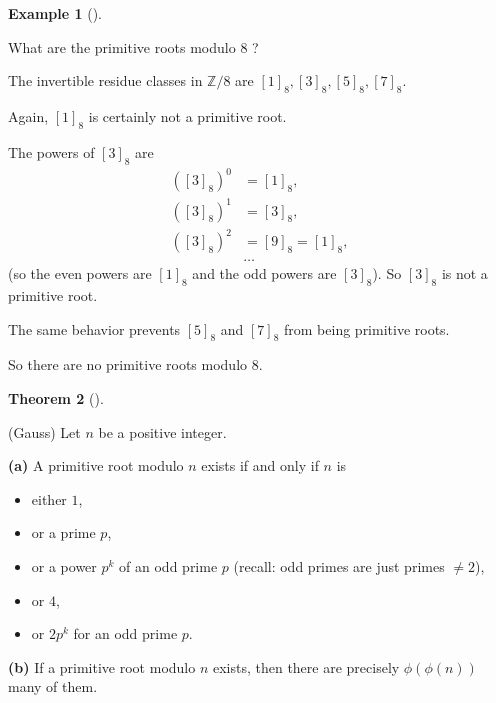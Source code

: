 \documentclass[numbers=enddot,12pt,final,onecolumn,notitlepage]{scrartcl}%
\numberwithin{exer}{subsection}
\theoremstyle{definition}
\newtheorem{theo}{Theorem}[subsection]
\newenvironment{theorem}[1][]
{\begin{theo}[#1]\begin{leftbar}}
{\end{leftbar}\end{theo}}
\newtheorem{exam}[theo]{Example}
\newenvironment{example}[1][]
{\begin{exam}[#1]\begin{leftbar}}
{\end{leftbar}\end{exam}}
\begin{document}
\begin{example}
What are the primitive roots modulo $8$ ?

The invertible residue classes in $\mathbb{Z}/8$ are $\left[  1\right]
_{8},\left[  3\right]  _{8},\left[  5\right]  _{8},\left[  7\right]  _{8}$.

Again, $\left[  1\right]  _{8}$ is certainly not a primitive root.

The powers of $\left[  3\right]  _{8}$ are
\begin{align*}
\left(  \left[  3\right]  _{8}\right)  ^{0}  &  =\left[  1\right]  _{8},\\
\left(  \left[  3\right]  _{8}\right)  ^{1}  &  =\left[  3\right]  _{8},\\
\left(  \left[  3\right]  _{8}\right)  ^{2}  &  =\left[  9\right]
_{8}=\left[  1\right]  _{8},\\
&  \ldots
\end{align*}
(so the even powers are $\left[  1\right]  _{8}$ and the odd powers are
$\left[  3\right]  _{8}$). So $\left[  3\right]  _{8}$ is not a primitive root.

The same behavior prevents $\left[  5\right]  _{8}$ and $\left[  7\right]
_{8}$ from being primitive roots.

So there are no primitive roots modulo $8$.
\end{example}

\begin{theorem}
(Gauss) Let $n$ be a positive integer.

\textbf{(a)} A primitive root modulo $n$ exists if and only if $n$ is

\begin{itemize}
\item either $1$,

\item or a prime $p$,

\item or a power $p^{k}$ of an odd prime $p$ (recall: odd primes are just
primes $\neq2$),

\item or $4$,

\item or $2p^{k}$ for an odd prime $p$.
\end{itemize}

\textbf{(b)} If a primitive root modulo $n$ exists, then there are precisely
$\phi\left(  \phi\left(  n\right)  \right)  $ many of them.
\end{theorem}
\end{document}
